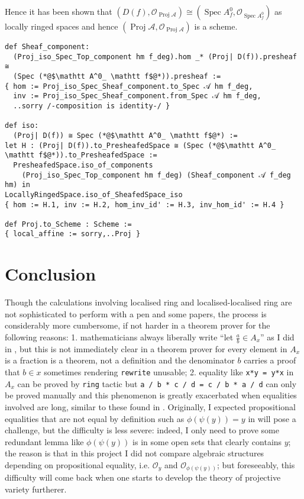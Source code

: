 \documentclass[a4paper,UKenglish,cleveref, autoref, thm-restate]{lipics-v2021}
\begin{document}
Hence it has been shown that $(D(f), \mathcal{O}_{\operatorname{Proj}\mathcal A})\cong (\operatorname{Spec}A^0_f, \mathcal{O}_{\operatorname{Spec}A^0_f})$ as locally ringed spaces and hence $(\operatorname{Proj}\mathcal A, \mathcal{O}_{\operatorname{Proj}\mathcal A})$ is a scheme.
\begin{lstlisting}
def Sheaf_component:
  (Proj_iso_Spec_Top_component hm f_deg).hom _* (Proj| D(f)).presheaf ≅
  (Spec (*@$\mathtt A^0_ \mathtt f$@*)).presheaf :=
{ hom := Proj_iso_Spec_Sheaf_component.to_Spec 𝒜 hm f_deg,
  inv := Proj_iso_Spec_Sheaf_component.from_Spec 𝒜 hm f_deg,
  ..sorry /-composition is identity-/ }

def iso:
  (Proj| D(f)) ≅ Spec (*@$\mathtt A^0_ \mathtt f$@*) :=
let H : (Proj| D(f)).to_PresheafedSpace ≅ (Spec (*@$\mathtt A^0_ \mathtt f$@*)).to_PresheafedSpace :=
  PresheafedSpace.iso_of_components
    (Proj_iso_Spec_Top_component hm f_deg) (Sheaf_component 𝒜 f_deg hm) in
LocallyRingedSpace.iso_of_SheafedSpace_iso
{ hom := H.1, inv := H.2, hom_inv_id' := H.3, inv_hom_id' := H.4 }

def Proj.to_Scheme : Scheme :=
{ local_affine := sorry,..Proj }
\end{lstlisting}

\section{Conclusion} 
Though the calculations involving localised ring and localised-localised ring are not sophisticated to perform with a pen and some papers, the process is considerably more cumbersome, if not harder in a theorem prover for the following reasons: 1. mathematicians always liberally write ``let $\frac a b\in A_x$'' as I did in , but this is not immediately clear in a theorem prover for every element in $A_x$ is a fraction is a theorem, not a definition and the denominator $b$ carries a proof that $b\in x$ sometimes rendering \lstinline{rewrite} unusable; 2. equality like \lstinline{x*y = y*x} in $A_x$ can be proved by \lstinline{ring} tactic but \lstinline{a / b * c / d = c / b * a / d} can only be proved manually and this phenomenon is greatly exacerbated when equalities involved are long, similar to these found in . Originally, I expected propositional equalities that are not equal by definition such as $\phi(\psi(y)) = y$ in  will pose a challenge, but the difficulty is less severe: indeed, I only need to prove some redundant lemma like $\phi(\psi(y))$ is in some open sets that clearly contains $y$; the reason is that in this project I did not compare algebraic structures depending on propositional equality, i.e. $\mathcal{O}_{y}$ and $\mathcal{O}_{\phi(\psi(y))}$; but foreseeably, this difficulty will come back when one starts to develop the theory of projective variety furtherer.
\end{document}
